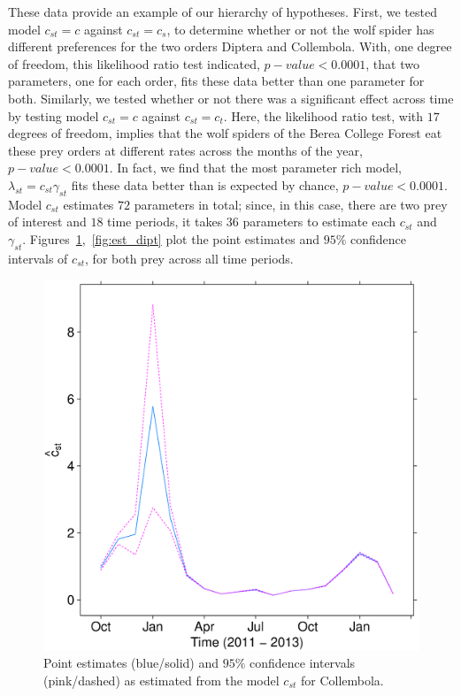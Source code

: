 These data provide an example of our hierarchy of hypotheses.  First, we tested model $c_{st} = c$ against $c_{st} = c_s$, to determine whether or not the wolf spider has different preferences for the two orders Diptera  and Collembola.  With, one degree of freedom, this likelihood ratio test indicated, $p-value < 0.0001$,  that two parameters, one for each order, fits these data better than one parameter for both.  Similarly, we tested whether or not there was a significant effect across time by testing model $c_{st} = c$ against $c_{st} = c_t$.  Here, the likelihood ratio test, with $17$ degrees of freedom, implies that the wolf spiders of the Berea College Forest eat these prey orders at different rates across the months of the year, $p-value < 0.0001$.  In fact, we find that the most parameter rich model, $\lambda_{st} = c_{st} \gamma_{st}$ fits these data better than is expected by chance, $p-value < 0.0001$.  Model $c_{st}$ estimates $72$ parameters in total; since, in this case, there are two prey of interest and $18$ time periods, it takes $36$ parameters to estimate each $c_{st}$ and $\gamma_{st}$.  Figures~\ref{fig:est_coll},~\ref{fig:est_dipt} plot the point estimates and $95\%$ confidence intervals of $c_{st}$, for both prey across all time periods.  

\begin{figure}
  \centering
  \includegraphics[scale=0.35]{est_coll}
  \caption{Point estimates (blue/solid) and $95\%$ confidence intervals (pink/dashed) as estimated from the model $c_{st}$ for Collembola.}
  \label{fig:est_coll}
\end{figure}

